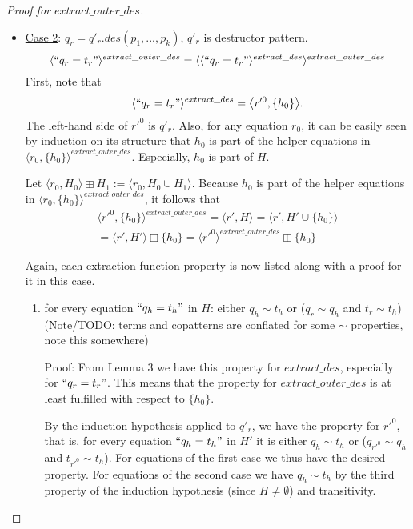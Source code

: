 \documentclass[11pt]{article} %
\begin{document}
\begin{proof}[Proof for $extract\_outer\_des$]
\begin{itemize}
\item \underline{Case 2}: $q_r = q'_r.des(p_1, ..., p_k)$, $q'_r$ is destructor pattern.
\begin{equation*}
\langle `` q_r = t_r " \rangle^{extract\_outer\_des} = \langle \langle `` q_r = t_r " \rangle^{extract\_des} \rangle^{extract\_outer\_des}
\end{equation*}
First, note that
\begin{equation*}
\langle `` q_r = t_r " \rangle^{extract\_des} = \big\langle r'^0, \{h_0\} \big\rangle.
\end{equation*}
The left-hand side of $r'^0$ is $q'_r$. Also, for any equation $r_0$, it can be easily seen by induction on its structure that $h_0$ is part of the helper equations in $\big\langle r_0, \{h_0\} \big\rangle^{extract\_outer\_des}$. Especially, $h_0$ is part of $H$.

Let $\big\langle r_0, H_0 \big\rangle \boxplus H_1 := \big\langle r_0, H_0 \cup H_1 \big\rangle$. Because $h_0$ is part of the helper equations in $\langle r_0, \{h_0\} \rangle^{extract\_outer\_des}$, it follows that
\begin{multline*}
\langle r'^0, \{h_0\} \rangle^{extract\_outer\_des} = \big\langle r', H \big\rangle = \big\langle r', H' \cup \{h_0\} \big\rangle \\
= \big\langle r', H' \big\rangle \boxplus \{h_0\} = \langle r'^0 \rangle^{extract\_outer\_des} \boxplus \{h_0\}
\end{multline*}

Again, each extraction function property is now listed along with a proof for it in this case.

\begin{enumerate}

\item for every equation $`` q_h = t_h "$ in $H$: either $q_h \sim t_h$ or ($q_r \sim q_h$ and $t_r \sim t_h$) (Note/TODO: terms and copatterns are conflated for some $\sim$ properties, note this somewhere)

Proof: From Lemma 3 we have this property for $extract\_des$, especially for $`` q_r = t_r "$. This means that the property for $extract\_outer\_des$ is at least fulfilled with respect to $\{h_0\}$.

By the induction hypothesis applied to $q'_r$, we have the property for $r'^0$, that is, for every equation $`` q_h = t_h "$ in $H'$ it is either $q_h \sim t_h$ or ($q_{r'^0} \sim q_h$ and $t_{r'^0} \sim t_h$). For equations of the first case we thus have the desired property. For equations of the second case we have $q_h \sim t_h$ by the third property of the induction hypothesis (since $H \neq \emptyset$) and transitivity.


\end{enumerate}
\end{itemize}
\end{proof}
\end{document}
